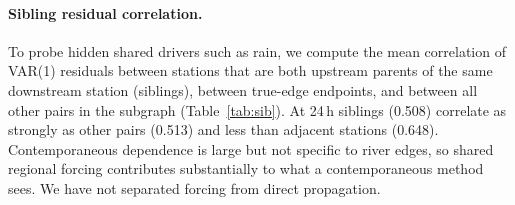 \documentclass[10pt,a4paper]{article}
\begin{document}
\begin{table}[t]\centering\small

\caption{Orientation accuracy on contemporaneous edges, raw versus standardised data.}\label{tab:raw}
\end{table}

\paragraph{Sibling residual correlation.}
To probe hidden shared drivers such as rain, we compute the mean correlation of VAR(1) residuals between stations that are both upstream parents of the same downstream station (siblings), between true-edge endpoints, and between all other pairs in the subgraph (Table~\ref{tab:sib}). At 24\,h siblings (0.508) correlate as strongly as other pairs (0.513) and less than adjacent stations (0.648). Contemporaneous dependence is large but not specific to river edges, so shared regional forcing contributes substantially to what a contemporaneous method sees. We have not separated forcing from direct propagation.

\begin{table}[t]\centering\small

\caption{Mean VAR(1) residual correlation (standardised, all 120 subgraphs).}\label{tab:sib}
\end{table}
\end{document}
